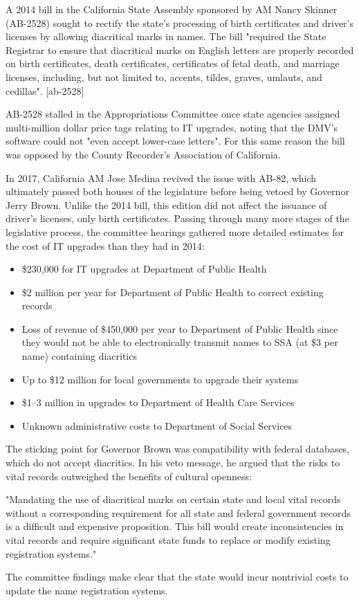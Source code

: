 A 2014 bill in the California State Assembly sponsored by AM Nancy Skinner
(AB-2528) sought to rectify the state's processing of birth certificates and
driver's licenses by allowing diacritical marks in names. The bill "required the
State Registrar to ensure that diacritical marks on English letters are properly
recorded on birth certificates, death certificates, certificates of fetal death,
and marriage licenses, including, but not limited to, accents, tildes, graves,
umlauts, and cedillas". [ab-2528]

AB-2528 stalled in the Appropriations Committee once state agencies assigned
multi-million dollar price tags relating to IT upgrades, noting that the DMV's
software could not "even accept lower-case letters". For this same reason the
bill was opposed by the County Recorder's Association of California.

In 2017, California AM Jose Medina revived the issue with AB-82, which
ultimately passed both houses of the legislature before being vetoed by Governor
Jerry Brown. Unlike the 2014 bill, this edition did not affect the issuance of
driver's licenses, only birth certificates. Passing through many more stages of
the legislative process, the committee hearings gathered more detailed estimates
for the cost of IT upgrades than they had in 2014:

\begin{itemize}

\item \$230,000 for IT upgrades at Department of Public Health
\item \$2 million per year for Department of Public Health to correct existing
records
\item Loss of revenue of \$450,000 per year to Department of Public Health since
they would not be able to electronically transmit names to SSA (at \$3 per name)
containing diacritics
\item Up to \$12 million for local governments to upgrade their systems
\item \$1--3 million in upgrades to Department of Health Care Services
\item Unknown administrative costs to Department of Social Services

\end{itemize}

The sticking point for Governor Brown was compatibility with federal databases,
which do not accept diacritics. In his veto message, he argued that the risks to
vital records outweighed the benefits of cultural openness:

"Mandating the use of diacritical marks on certain state and local vital records
without a corresponding requirement for all state and federal government records
is a difficult and expensive proposition. This bill would create inconsistencies
in vital records and require significant state funds to replace or modify
existing registration systems."

The committee findings make clear that the state would incur nontrivial costs to
update the name registration systems.
